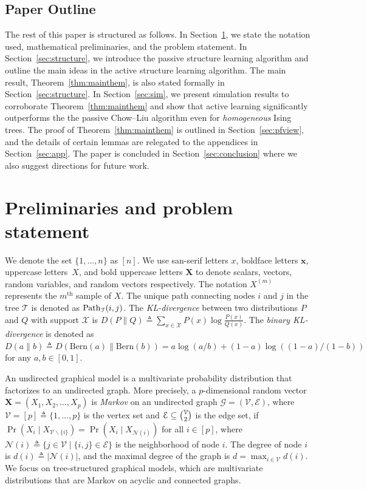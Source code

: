 \documentclass[11pt,onecolumn]{article}
\newcommand{\calE}{\mathcal{E}}
\newcommand{\calG}{\mathcal{G}}
\newcommand{\calN}{\mathcal{N}}
\newcommand{\calT}{\mathcal{T}}
\newcommand{\calV}{\mathcal{V}}
\newcommand{\calX}{\mathcal{X}}
\newcommand{\bx}{\mathbf{x}}
\newcommand{\bX}{\mathbf{X}}
\newcommand{\barX}{\bar{X}}
\begin{document}
\subsection{Paper Outline}
The rest of this paper is structured as follows. In Section~\ref{sec:prelim}, we state the notation used, mathematical preliminaries, and the problem statement. In Section~\ref{sec:structure}, we introduce the passive structure learning algorithm  and outline the main ideas in the active structure learning algorithm. The main result, Theorem~\ref{thm:mainthem},  is also stated formally in Section~\ref{sec:structure}.  In Section~\ref{sec:sim}, we present simulation results to corroborate Theorem~\ref{thm:mainthem} and show that active learning significantly outperforms the the passive Chow--Liu algorithm even for {\em homogeneous} Ising trees. The proof of Theorem~\ref{thm:mainthem} is outlined in Section~\ref{sec:pfview}, and the details of certain lemmas are relegated to the appendices in Section~\ref{sec:app}. The paper is concluded in Section~\ref{sec:conclusion} where we also suggest directions for future work. 

\section{Preliminaries and problem statement}\label{sec:prelim}
We denote the set $\{1,\ldots,n\}$ as $[n]$. We use san-serif letters $x$, boldface letters $\bx$, uppercase letters~$X$, and bold uppercase letters $\bX$ %
to denote scalars, vectors, random 
variables,  and random vectors respectively. 
The notation $X^{(m)}$ represents the $m^{\mathrm{th}}$ sample of $X$. The unique path connecting nodes $i$ and $j$ in the tree $\calT$ is denoted as ${\rm Path}_{\calT}(i,j)$. The {\em KL-divergence}   between two distributions $P$ and $Q$ with support $\calX$ is 
$D(P\|Q)\triangleq\sum_{x\in\calX}P(x)\log\frac{P(x)}{Q(x)}$. 
The {\em binary KL-divergence}  is denoted as  $D(a\|b)\triangleq D(\mathrm{Bern}(a) \| \mathrm{Bern}(b)) = a\log (a/b)+(1-a)\log( (1-a)/(1-b))$ for any $a,b\in [0,1]$. %

An undirected graphical model is a multivariate probability distribution that factorizes to an undirected graph\cite{lauritzen1996graphical}. More precisely, a $p$-dimensional random vector $\bX=(X_{1},X_{2},\ldots,X_{p})$ is \emph{Markov} on an undirected graph $\calG=(\calV,\calE)$, where $\calV=[p]\triangleq\{1,\ldots,p\}$ is the vertex set and $\calE\subseteq\tbinom{\calV}{2}$ is the edge set, if $\Pr(X_{i} \mid X_{\calV\backslash \{i\}})=\Pr(X_{i} \mid X_{\calN(i)})$ for all $i\in[p]$, where $\calN(i)\triangleq\{j\in\calV \mid \{i,j\}\in\calE\}$ is the neighborhood of node $i$. The degree of  node $i$ is $d (i)\triangleq |\calN(i)|$, and the maximal degree of the graph is $d=\max_{i\in\calV} d (i)$. We focus on   tree-structured graphical models, which are   multivariate distributions that are Markov on  acyclic and connected  graphs.
\end{document}
